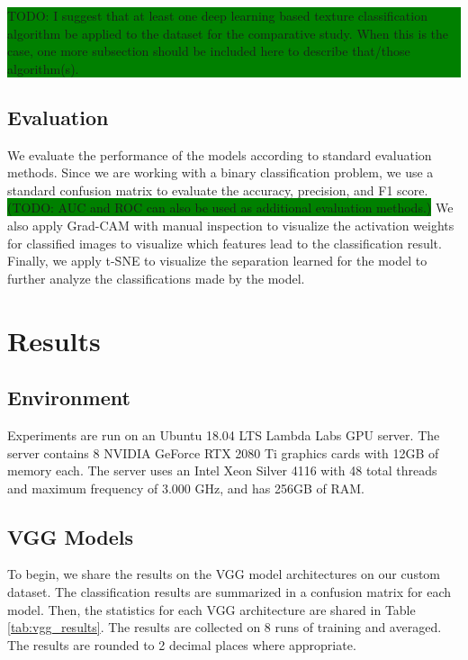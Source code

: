 \documentclass{aci}
\numberwithin{equation}{section}
\begin{document}
\colorbox{green}{\parbox{\dimexpr\textwidth-2\fboxsep}{TODO: I suggest that
        at least one deep learning based texture classification algorithm be applied
        to the dataset for the comparative study. When this is the case, one more
        subsection should be included here to describe that/those algorithm(s).}}

\subsection{Evaluation}

We evaluate the performance of the models according to standard evaluation
methods. Since we are working with a binary classification problem, we use a
standard confusion matrix to evaluate the accuracy, precision, and F1 score.
\colorbox{green}{(TODO: AUC and ROC can also be used as additional evaluation
    methods.)} We also apply Grad-CAM with manual inspection to visualize the
activation weights for classified images to visualize which features lead to the
classification result. Finally, we apply t-SNE to visualize the separation
learned for the model to further analyze the classifications made by the model.

\section{Results}
\subsection{Environment}

Experiments are run on an Ubuntu 18.04 LTS Lambda Labs GPU server. The server
contains 8 NVIDIA GeForce RTX 2080 Ti graphics cards with 12GB of memory each.
The server uses an Intel Xeon Silver 4116 with 48 total threads and maximum
frequency of 3.000 GHz, and has 256GB of RAM.

\subsection{VGG Models}

To begin, we share the results on the VGG model architectures on our custom
dataset. The classification results are summarized in a confusion matrix for
each model. Then, the statistics for each VGG architecture are shared in Table
\ref{tab:vgg_results}. The results are collected on 8 runs of training and
averaged. The results are rounded to 2 decimal places where appropriate.
\end{document}
